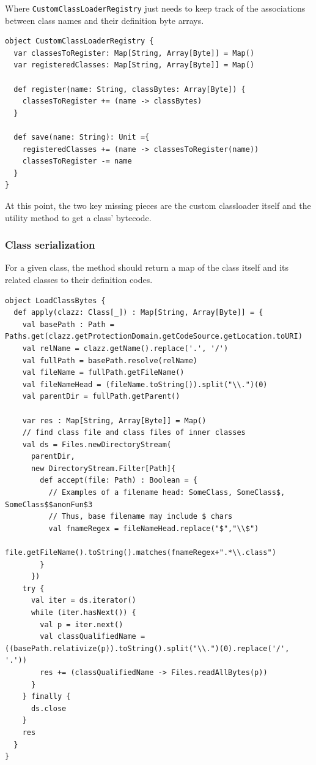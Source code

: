 \documentclass[11pt]{llncs}
\begin{document}
Where \texttt{CustomClassLoaderRegistry} just needs to keep track of the associations between class names and their definition byte arrays.

\begin{lstlisting}
object CustomClassLoaderRegistry {
  var classesToRegister: Map[String, Array[Byte]] = Map()
  var registeredClasses: Map[String, Array[Byte]] = Map()

  def register(name: String, classBytes: Array[Byte]) {
    classesToRegister += (name -> classBytes)
  }

  def save(name: String): Unit ={
    registeredClasses += (name -> classesToRegister(name))
    classesToRegister -= name
  }
}
\end{lstlisting}

At this point, the two key missing pieces are the custom classloader itself and the utility method to get a class' bytecode.

\subsubsection{Class serialization}

For a given class, the method should return a map of the class itself and its related classes to their definition codes.

\begin{lstlisting}
object LoadClassBytes {
  def apply(clazz: Class[_]) : Map[String, Array[Byte]] = {
    val basePath : Path = Paths.get(clazz.getProtectionDomain.getCodeSource.getLocation.toURI)
    val relName = clazz.getName().replace('.', '/')
    val fullPath = basePath.resolve(relName)
    val fileName = fullPath.getFileName()
    val fileNameHead = (fileName.toString()).split("\\.")(0)
    val parentDir = fullPath.getParent()

    var res : Map[String, Array[Byte]] = Map()
    // find class file and class files of inner classes
    val ds = Files.newDirectoryStream(
      parentDir,
      new DirectoryStream.Filter[Path]{
        def accept(file: Path) : Boolean = {
          // Examples of a filename head: SomeClass, SomeClass$, SomeClass$$anonFun$3
          // Thus, base filename may include $ chars
          val fnameRegex = fileNameHead.replace("$","\\$")
          file.getFileName().toString().matches(fnameRegex+".*\\.class")
        }
      })
    try {
      val iter = ds.iterator()
      while (iter.hasNext()) {
        val p = iter.next()
        val classQualifiedName = ((basePath.relativize(p)).toString().split("\\.")(0).replace('/', '.'))
        res += (classQualifiedName -> Files.readAllBytes(p))
      }
    } finally {
      ds.close
    }
    res
  }
}
\end{lstlisting}
\end{document}
